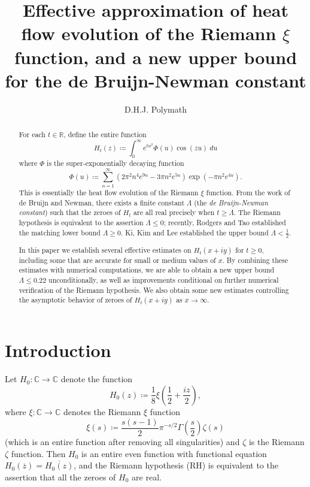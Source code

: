 \documentclass[a4paper,11pt,twoside]{amsart}
\newcommand\R{\mathbb{R}}
\newcommand\C{\mathbb{C}}
\begin{document}
\title[Upper bound for de Bruijn-Newman constant]{Effective approximation of heat flow evolution of the Riemann $\xi$ function, and a new upper bound for the de Bruijn-Newman constant}

\author{D.H.J. Polymath}
\address{\tt{http://michaelnielsen.org/polymath1/index.php}}


\begin{abstract}
For each $t \in \R$, define the entire function
$$ H_t(z) \coloneqq \int_0^\infty e^{tu^2} \Phi(u) \cos(zu)\ du$$
where $\Phi$ is the super-exponentially decaying function
$$ \Phi(u) \coloneqq \sum_{n=1}^\infty (2\pi^2  n^4 e^{9u} - 3\pi n^2 e^{5u} ) \exp(-\pi n^2 e^{4u} ).$$
This is essentially the heat flow evolution of the Riemann $\xi$ function.
From the work of de Bruijn and Newman, there exists a finite constant $\Lambda$ (the \emph{de Bruijn-Newman constant}) such that the zeroes of $H_t$ are all real precisely when $t \geq \Lambda$.  The Riemann hypothesis is equivalent to the assertion $\Lambda \leq 0$; recently, Rodgers and Tao established the matching lower bound $\Lambda \geq 0$.  Ki, Kim and Lee established the upper bound $\Lambda < \frac{1}{2}$.

In this paper we establish several effective estimates on $H_t(x+iy)$ for $t \geq 0$, including some that are accurate for small or medium values of $x$.  By combining these estimates with numerical computations, we are able to obtain a new upper bound $\Lambda \leq 0.22$ unconditionally, as well as improvements conditional on further numerical verification of the Riemann hypothesis.  We also obtain some new estimates controlling the asymptotic behavior of zeroes of $H_t(x+iy)$ as $x \to \infty$.
\end{abstract}


\maketitle

\section{Introduction}

Let $H_0 \colon \C \to \C$ denote the function
\begin{equation}\label{hoz}
 H_0(z) \coloneqq \frac{1}{8} \xi\left(\frac{1}{2} + \frac{iz}{2}\right),
\end{equation}
where $\xi \colon \C \to \C$ denotes the Riemann $\xi$ function
\begin{equation}\label{sas}
 \xi(s) \coloneqq \frac{s(s-1)}{2} \pi^{-s/2} \Gamma\left(\frac{s}{2}\right) \zeta(s)
\end{equation}
(which is an entire function after removing all singularities) and $\zeta$ is the Riemann $\zeta$ function.
Then $H_0$ is an entire even function with functional equation $H_0(\overline{z}) = \overline{H_0(z)}$, and the Riemann hypothesis (RH) is equivalent to the assertion that all the zeroes of $H_0$ are real.
\end{document}
